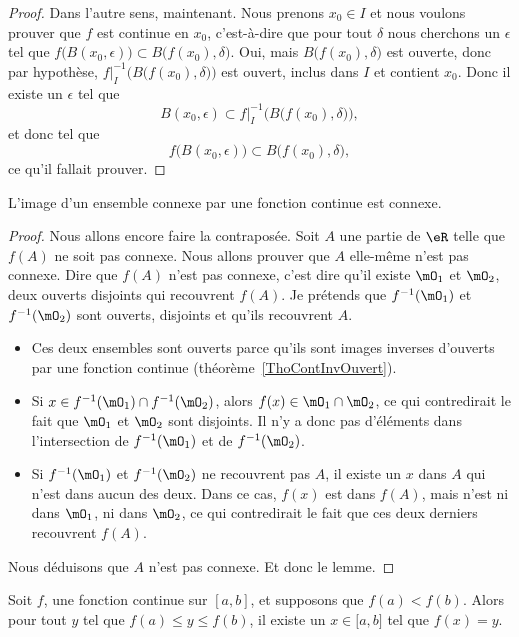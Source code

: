 \begin{proof}
Dans l'autre sens, maintenant. Nous prenons $x_0\in I$ et nous voulons prouver que $f$ est continue en $x_0$, c'est-à-dire que pour tout $\delta$ nous cherchons un $\epsilon$ tel que $f\big( B(x_0,\epsilon) \big)\subset B\big( f(x_0),\delta \big)$. Oui, mais $B\big( f(x_0),\delta \big)$ est ouverte, donc par hypothèse, $f|_I^{-1}\Big( B\big( f(x_0),\delta \big) \Big)$ est ouvert, inclus dans $I$ et contient $x_0$. Donc il existe un $\epsilon$ tel que
\[
  B(x_0,\epsilon)\subset f|_I^{-1}\Big( B\big( f(x_0),\delta \big) \Big),
\]
et donc tel que
\[
  f\big( B(x_0,\epsilon) \big)\subset B\big( f(x_0),\delta \big),
\]
ce qu'il fallait prouver.
\end{proof}

\begin{lemma}   \label{LemConncontconn}
L'image d'un ensemble connexe par une fonction continue est connexe.
\end{lemma}

\begin{proof}
Nous allons encore faire la contraposée. Soit $A$ une partie de $\eR$ telle que $f(A)$ ne soit pas connexe. Nous allons prouver que $A$ elle-même n'est pas connexe. Dire que $f(A)$ n'est pas connexe, c'est dire qu'il existe $\mO_1$ et $\mO_2$, deux ouverts disjoints qui recouvrent $f(A)$. Je prétends que $f^{-1}(\mO_1)$ et $f^{-1}(\mO_2)$ sont ouverts, disjoints et qu'ils recouvrent $A$.
\begin{itemize}
\item Ces deux ensembles sont ouverts parce qu'ils sont images inverses d'ouverts par une fonction continue (théorème~\ref{ThoContInvOuvert}).
\item Si $x\in f^{-1}(\mO_1)\cap f^{-1}(\mO_2)$, alors $f(x)\in \mO_1\cap\mO_2$, ce qui contredirait le fait que $\mO_1$ et $\mO_2$ sont disjoints. Il n'y a donc pas d'éléments dans l'intersection de $f^{-1}(\mO_1)$ et de $f^{-1}(\mO_2)$.
\item Si $f^{-1}(\mO_1)$ et $f^{-1}(\mO_2)$ ne recouvrent pas $A$, il existe un $x$ dans $A$ qui n'est dans aucun des deux. Dans ce cas, $f(x)$ est dans $f(A)$, mais n'est ni dans $\mO_1$, ni dans $\mO_2$, ce qui contredirait le fait que ces deux derniers recouvrent $f(A)$.
\end{itemize}
Nous déduisons que $A$ n'est pas connexe. Et donc le lemme.
\end{proof}

\begin{theorem}        \label{ThoValInter}
    Soit $f$, une fonction continue sur $[a,b]$, et supposons que $f(a)<f(b)$. Alors pour tout $y$ tel que $f(a)\leq y\leq f(b)$, il existe un \( x\in\mathopen[ a , b \mathclose]\) tel que $f(x)=y$.
\end{theorem}

